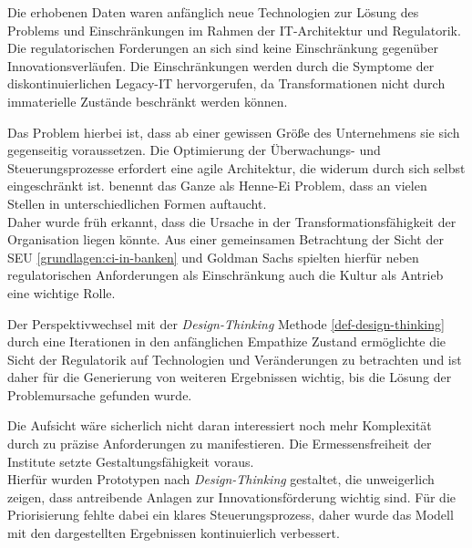 Die erhobenen Daten waren anfänglich neue Technologien zur Lösung des Problems und Einschränkungen im Rahmen der IT-Architektur und Regulatorik. Die regulatorischen Forderungen an sich sind keine Einschränkung gegenüber Innovationsverläufen. Die Einschränkungen werden durch die Symptome der diskontinuierlichen Legacy-IT hervorgerufen, da Transformationen nicht durch immaterielle Zustände beschränkt werden können.

Das Problem hierbei ist, dass ab einer gewissen Größe des Unternehmens sie sich gegenseitig voraussetzen. Die Optimierung der Überwachungs- und Steuerungsprozesse erfordert eine agile Architektur, die widerum durch sich selbst eingeschränkt ist. \citet{Ganswindt2006} benennt das Ganze als Henne-Ei Problem, dass an vielen Stellen in unterschiedlichen Formen auftaucht.
\medskip
\\
Daher wurde früh erkannt, dass die Ursache in der Transformationsfähigkeit der Organisation liegen könnte. Aus einer gemeinsamen Betrachtung der Sicht der \ac{SEU} \ref{grundlagen:ci-in-banken} und Goldman Sachs \cite{Gupta:2017} spielten hierfür neben regulatorischen Anforderungen als Einschränkung auch die Kultur als Antrieb eine wichtige Rolle.

Der Perspektivwechsel mit der \emph{Design-Thinking} Methode \ref{def-design-thinking} durch eine Iterationen in den anfänglichen Empathize Zustand ermöglichte die Sicht der Regulatorik auf Technologien und Veränderungen zu betrachten und ist daher für die Generierung von weiteren Ergebnissen wichtig, bis die Lösung der Problemursache gefunden wurde.

Die Aufsicht wäre sicherlich nicht daran interessiert noch mehr Komplexität durch zu präzise Anforderungen zu manifestieren. Die Ermessensfreiheit der Institute setzte Gestaltungsfähigkeit voraus.
\medskip
\\
Hierfür wurden Prototypen nach \emph{Design-Thinking} gestaltet, die unweigerlich zeigen, dass antreibende Anlagen zur Innovationsförderung wichtig sind. Für die Priorisierung fehlte dabei ein klares Steuerungsprozess, daher wurde das Modell mit den dargestellten Ergebnissen kontinuierlich verbessert.


